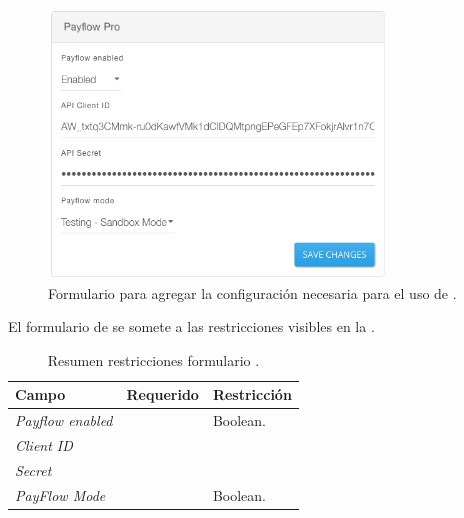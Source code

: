 			\begin{figure}[H]
				\centering
				\includegraphics[width=0.8\textwidth]{figuras/payment/form.png}
				\caption{Formulario para agregar la configuración necesaria para el uso de \paypalPayFlowNAME.}
				\label{figure:payment:paypal:payflow_pro:form}
			\end{figure}

			El formulario de \paypalNAME se somete a las restricciones visibles en la .

			\begin{table}[H]
			    \centering
				\begin{tabular}{ |l|c||l| }
					\hline Campo & Requerido & Restricción \\ \hline
					\multirow{1}{*}{\textit{Payflow enabled}} 	&  \checkmark 	& Boolean.\\ \hline
					\multirow{1}{*}{\textit{Client ID}} 		&  				& \\ \hline
					\multirow{1}{*}{\textit{Secret}} 			&  				& \\ \hline
					\multirow{1}{*}{\textit{PayFlow Mode}} 		&  \checkmark	& Boolean.\\ \hline
					\hline
				\end{tabular}
			 	\caption{ Resumen restricciones formulario \paypalPayFlowNAME.}
			    \label{tab:payment:paypal:payflow_pro:form}
			\end{table}
			

